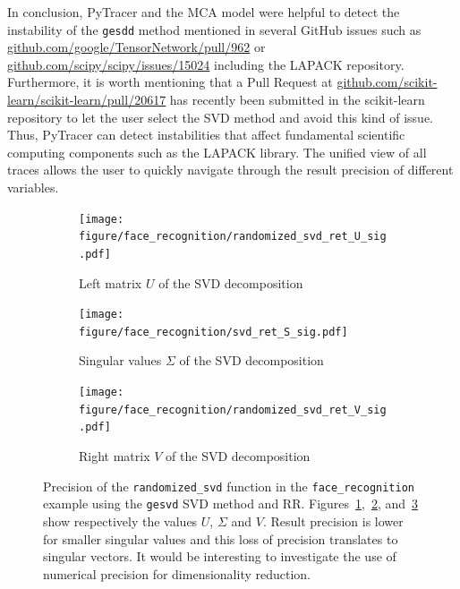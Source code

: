 \documentclass[10pt,journal,compsoc]{IEEEtran}
\newcommand{\pytracer}[0]{PyTracer\xspace}
\begin{document}
In conclusion, \pytracer and the MCA model were helpful to detect the
instability of the \texttt{gesdd} method mentioned in several GitHub issues such
as
\href{https://github.com/google/TensorNetwork/pull/962}{github.com/google/TensorNetwork/pull/962}
or
\href{https://github.com/scipy/scipy/issues/15024}{github.com/scipy/scipy/issues/15024}
including the LAPACK repository. Furthermore, it is worth mentioning that a Pull
Request at
\href{https://github.com/scikit-learn/scikit-learn/pull/20617}{github.com/scikit-learn/scikit-learn/pull/20617}
has recently been submitted in the scikit-learn repository to let the user
select the SVD method and avoid this kind of issue. Thus, \pytracer can detect
instabilities that affect fundamental scientific computing components such as
the LAPACK library. The unified view of all traces allows the user to quickly
navigate through the result precision of different variables.



\begin{figure}
    \centering
    \begin{subfigure}{0.3\linewidth}
        \texttt{[image: figure/face\_recognition/randomized\_svd\_ret\_U\_sig.pdf]}
        \caption{Left matrix $U$ of the SVD decomposition}
        \label{fig:randomized_svd_U}
    \end{subfigure}
    \begin{subfigure}{0.3\linewidth}
        \texttt{[image: figure/face\_recognition/svd\_ret\_S\_sig.pdf]}
        \caption{Singular values $\Sigma$ of the SVD decomposition}
        \label{fig:randomized_svd_S}
    \end{subfigure}
    \begin{subfigure}{0.3\linewidth}
        \texttt{[image: figure/face\_recognition/randomized\_svd\_ret\_V\_sig.pdf]}
        \caption{Right matrix $V$ of the SVD decomposition}
        \label{fig:randomized_svd_V}
    \end{subfigure}
    \caption{Precision of the \texttt{randomized\_svd} function in the
        \texttt{face\_recognition} example using the \texttt{gesvd} SVD method
        and RR. Figures~\ref{fig:randomized_svd_U},~\ref{fig:randomized_svd_S},
        and~\ref{fig:randomized_svd_V} show respectively the values $U$,
        $\Sigma$ and $V$. Result precision is lower for smaller singular values
        and this loss of precision translates to singular vectors. It would be
        interesting to investigate the use of numerical precision for
        dimensionality reduction. }
    \label{fig:face_recognition_svd}
\end{figure}
\end{document}
